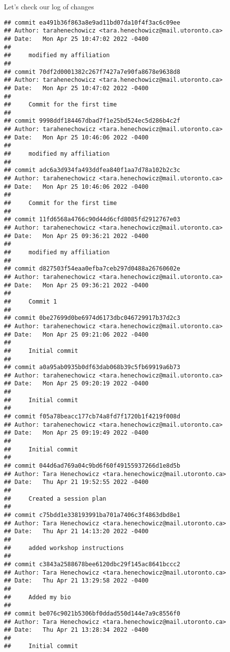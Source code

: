 \documentclass[ignorenonframetext,]{beamer}
\begin{document}
\begin{frame}[fragile]{Let's check our log of changes}

\begin{verbatim}
## commit ea491b36f863a8e9ad11bd07da10f4f3ac6c09ee
## Author: tarahenechowicz <tara.henechowicz@mail.utoronto.ca>
## Date:   Mon Apr 25 10:47:02 2022 -0400
## 
##     modified my affiliation
## 
## commit 70df2d0001382c267f7427a7e90fa8678e9638d8
## Author: tarahenechowicz <tara.henechowicz@mail.utoronto.ca>
## Date:   Mon Apr 25 10:47:02 2022 -0400
## 
##     Commit for the first time
## 
## commit 9998ddf184467dbad7f1e25bd524ec5d286b4c2f
## Author: tarahenechowicz <tara.henechowicz@mail.utoronto.ca>
## Date:   Mon Apr 25 10:46:06 2022 -0400
## 
##     modified my affiliation
## 
## commit adc6a3d934fa493ddfea840f1aa7d78a102b2c3c
## Author: tarahenechowicz <tara.henechowicz@mail.utoronto.ca>
## Date:   Mon Apr 25 10:46:06 2022 -0400
## 
##     Commit for the first time
## 
## commit 11fd6568a4766c90d44d6cfd8085fd2912767e03
## Author: tarahenechowicz <tara.henechowicz@mail.utoronto.ca>
## Date:   Mon Apr 25 09:36:21 2022 -0400
## 
##     modified my affiliation
## 
## commit d827503f54eaa0efba7ceb297d0488a26760602e
## Author: tarahenechowicz <tara.henechowicz@mail.utoronto.ca>
## Date:   Mon Apr 25 09:36:21 2022 -0400
## 
##     Commit 1
## 
## commit 0be27699d0be6974d6173dbc046729917b37d2c3
## Author: tarahenechowicz <tara.henechowicz@mail.utoronto.ca>
## Date:   Mon Apr 25 09:21:06 2022 -0400
## 
##     Initial commit
## 
## commit a0a95ab0935b0df63dab068b39c5fb69919a6b73
## Author: tarahenechowicz <tara.henechowicz@mail.utoronto.ca>
## Date:   Mon Apr 25 09:20:19 2022 -0400
## 
##     Initial commit
## 
## commit f05a78beacc177cb74a8fd7f1720b1f4219f008d
## Author: tarahenechowicz <tara.henechowicz@mail.utoronto.ca>
## Date:   Mon Apr 25 09:19:49 2022 -0400
## 
##     Initial commit
## 
## commit 044d6ad769a04c9bd6f60f49155937266d1e8d5b
## Author: Tara Henechowicz <tara.henechowicz@mail.utoronto.ca>
## Date:   Thu Apr 21 19:52:55 2022 -0400
## 
##     Created a session plan
## 
## commit c75bdd1e338193991ba701a7406c3f4863dbd8e1
## Author: Tara Henechowicz <tara.henechowicz@mail.utoronto.ca>
## Date:   Thu Apr 21 14:13:20 2022 -0400
## 
##     added workshop instructions
## 
## commit c3843a2588678bee6120dbc29f145ac8641bccc2
## Author: Tara Henechowicz <tara.henechowicz@mail.utoronto.ca>
## Date:   Thu Apr 21 13:29:58 2022 -0400
## 
##     Added my bio
## 
## commit be076c9021b5306bf0ddad550d144e7a9c8556f0
## Author: Tara Henechowicz <tara.henechowicz@mail.utoronto.ca>
## Date:   Thu Apr 21 13:28:34 2022 -0400
## 
##     Initial commit
\end{verbatim}

\end{frame}
\end{document}
